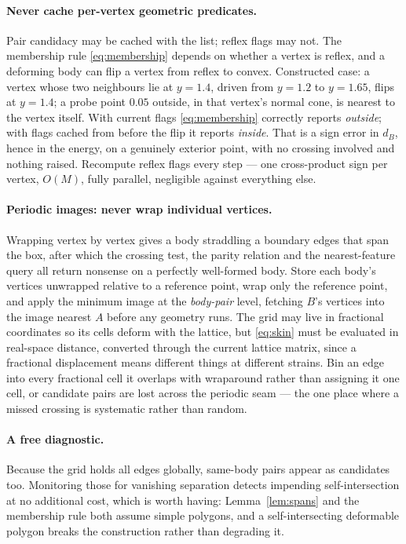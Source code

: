 \documentclass[11pt]{article}
\begin{document}
\paragraph{Never cache per-vertex geometric predicates.} Pair candidacy may be cached with the list; reflex flags may not. The membership rule \eqref{eq:membership} depends on whether a vertex is reflex, and a deforming body can flip a vertex from reflex to convex. Constructed case: a vertex whose two neighbours lie at $y = 1.4$, driven from $y = 1.2$ to $y = 1.65$, flips at $y = 1.4$; a probe point $0.05$ outside, in that vertex's normal cone, is nearest to the vertex itself. With current flags \eqref{eq:membership} correctly reports \emph{outside}; with flags cached from before the flip it reports \emph{inside}. That is a sign error in $d_B$, hence in the energy, on a genuinely exterior point, with no crossing involved and nothing raised. Recompute reflex flags every step --- one cross-product sign per vertex, $O(M)$, fully parallel, negligible against everything else.

\paragraph{Periodic images: never wrap individual vertices.} Wrapping vertex by vertex gives a body straddling a boundary edges that span the box, after which the crossing test, the parity relation and the nearest-feature query all return nonsense on a perfectly well-formed body. Store each body's vertices unwrapped relative to a reference point, wrap only the reference point, and apply the minimum image at the \emph{body-pair} level, fetching $B$'s vertices into the image nearest $A$ before any geometry runs. The grid may live in fractional coordinates so its cells deform with the lattice, but \eqref{eq:skin} must be evaluated in real-space distance, converted through the current lattice matrix, since a fractional displacement means different things at different strains. Bin an edge into every fractional cell it overlaps with wraparound rather than assigning it one cell, or candidate pairs are lost across the periodic seam --- the one place where a missed crossing is systematic rather than random.

\paragraph{A free diagnostic.} Because the grid holds all edges globally, same-body pairs appear as candidates too. Monitoring those for vanishing separation detects impending self-intersection at no additional cost, which is worth having: Lemma~\ref{lem:spans} and the membership rule both assume simple polygons, and a self-intersecting deformable polygon breaks the construction rather than degrading it.
\end{document}
